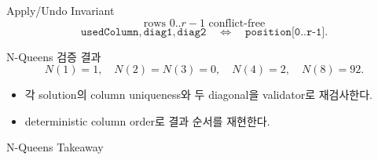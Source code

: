 \begin{frame}{Apply/Undo Invariant}
\[
\text{rows }0..r-1\text{ conflict-free}
\]
\[
\texttt{usedColumn},\texttt{diag1},\texttt{diag2}
\quad\Longleftrightarrow\quad
\texttt{position[0..r-1]}.
\]
\end{frame}
\begin{frame}{N-Queens 검증 결과}
\[
N(1)=1,\quad N(2)=N(3)=0,\quad N(4)=2,\quad N(8)=92.
\]
\begin{itemize}\item 각 solution의 column uniqueness와 두 diagonal을 validator로 재검사한다.\item deterministic column order로 결과 순서를 재현한다.\end{itemize}
\end{frame}
\begin{frame}{N-Queens Takeaway}
\end{frame}
